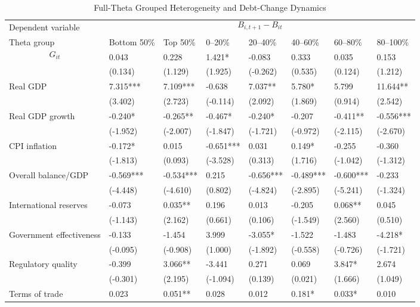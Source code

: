 \begin{table}[H]\centering
\begin{threeparttable}
\caption{Full-Theta Grouped Heterogeneity and Debt-Change Dynamics}
\label{tab:theta_group_heterogeneity_debt}
\scriptsize
\begin{tabularx}{\textwidth}{lYYYYYYY}
\toprule
Dependent variable &  \\
\cmidrule(lr){2-8}
Theta group & Bottom 50\% & Top 50\% & 0--20\% & 20--40\% & 40--60\% & 60--80\% & 80--100\% \\
\midrule
$$G_{it}$$ & 0.043 & 0.228 & 1.421* & -0.083 & 0.333 & 0.035 & 0.153 \\
  & (0.134) & (1.129) & (1.925) & (-0.262) & (0.535) & (0.124) & (1.212) \\
Real GDP & 7.315*** & 7.109*** & -0.638 & 7.037** & 5.780* & 5.799 & 11.644** \\
  & (3.402) & (2.723) & (-0.114) & (2.092) & (1.869) & (0.914) & (2.542) \\
Real GDP growth & -0.240* & -0.265** & -0.467* & -0.240* & -0.207 & -0.411** & -0.556*** \\
  & (-1.952) & (-2.007) & (-1.847) & (-1.721) & (-0.972) & (-2.115) & (-2.670) \\
CPI inflation & -0.172* & 0.015 & -0.651*** & 0.031 & 0.149* & -0.255 & -0.360 \\
  & (-1.813) & (0.093) & (-3.528) & (0.313) & (1.716) & (-1.042) & (-1.312) \\
Overall balance/GDP & -0.569*** & -0.534*** & 0.215 & -0.656*** & -0.489*** & -0.600*** & -0.233 \\
  & (-4.448) & (-4.610) & (0.802) & (-4.824) & (-2.895) & (-5.241) & (-1.324) \\
International reserves & -0.073 & 0.035** & 0.196 & 0.013 & -0.205 & 0.068** & 0.045 \\
  & (-1.143) & (2.162) & (0.661) & (0.106) & (-1.549) & (2.560) & (0.510) \\
Government effectiveness & -0.133 & -1.454 & 3.999 & -3.055* & -1.522 & -1.483 & -4.218* \\
  & (-0.095) & (-0.908) & (1.000) & (-1.892) & (-0.558) & (-0.726) & (-1.721) \\
Regulatory quality & -0.399 & 3.066** & -3.441 & 0.271 & 0.069 & 3.847* & 2.674 \\
  & (-0.301) & (2.195) & (-1.094) & (0.139) & (0.021) & (1.666) & (1.049) \\
Terms of trade & 0.023 & 0.051** & 0.028 & 0.012 & 0.181* & 0.033* & 0.010 \\

\end{tabularx}
\end{threeparttable}
\end{table}
